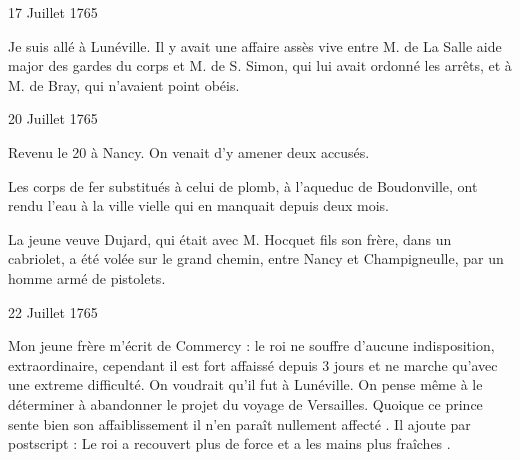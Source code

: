                      \begin{diary}{17 Juillet 1765}{}

                         Je suis allé à Lunéville. Il y avait une affaire assès vive entre M. de La Salle aide major
                           des gardes du corps et M. de S.
                              Simon, qui
                           lui avait ordonné les arrêts, et à M. de
                              Bray, qui n'avaient point obéis. \bigskip


                     \end{diary}

                     \begin{diary}{20 Juillet 1765}{}

                         Revenu le
                              20 à Nancy. On venait
                           d'y
                           amener deux accusés. \bigskip


                         Les corps de fer substitués à celui de
                           plomb,
                           à l'aqueduc de
                              Boudonville, ont rendu l'eau
                           à la ville vielle qui en
                           manquait depuis
                           deux mois. \bigskip



                           La jeune veuve Dujard, qui
                           était avec M.
                              Hocquet fils son frère, dans un cabriolet,
                           a été volée sur le grand chemin, entre
                           Nancy et Champigneulle, par un homme
                           armé de pistolets. \bigskip


                     \end{diary}

                     \begin{diary}{22 Juillet 1765}{}


                           Mon jeune frère m'écrit
                           de Commercy :
                           \og le roi ne souffre
                              d'aucune indisposition,
                              extraordinaire, cependant il est fort affaissé
                              depuis 3 jours et ne marche qu'avec
                              une extreme difficulté. On voudrait qu'il
                              fut à Lunéville. On
                              pense même à le
                              déterminer à abandonner le projet du
                              voyage de Versailles.
                              Quoique ce prince
                              sente bien son affaiblissement il n'en
                              paraît nullement affecté  \fg{}. Il ajoute par postscript : \og Le roi a recouvert plus de
                              force et a les mains plus fraîches \fg{}. \bigskip


                     \end{diary}

